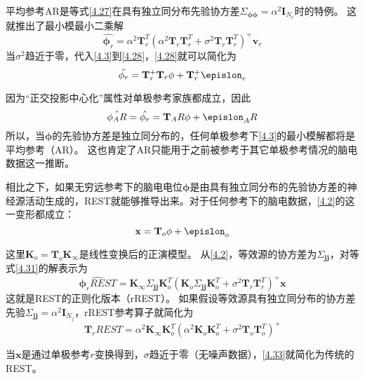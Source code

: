 平均参考AR是等式\eqref{4.27}在具有独立同分布先验协方差$\Sigma_{\mathbf{\phi\phi}}=\alpha^2\mathbf{I}_N_c$时的特例。 这就推出了最小模最小二乘解
\begin{equation}\label{4.28}
\hat{\mathbf{\phi}_r}=\alpha^2\mathbf{T}_r^T(\alpha^2\mathbf{T}_r\mathbf{T}_r^T+\sigma^2\mathbf{T}_r\mathbf{T}_r^T)^+\mathbf{v}_r
\end{equation}
当$\sigma^2$趋近于零，代入\eqref{4.3}到\eqref{4.28}，\eqref{4.28}就可以简化为
\begin{equation}\label{4.29}
\hat{\mathbf{\phi}_r}=\mathbf{T}_r^+\mathbf{T}_r\mathbf{\phi}+\mathbf{T}_r^+\mathbf{\epislon}_r
\end{equation}

因为“正交投影中心化”属性对单极参考家族都成立，因此
\begin{equation}\label{4.30}
\hat{\mathbf{\phi}_AR}=\hat{\mathbf{\phi}_r}=\mathbf{T}_AR\mathbf{\phi}+\mathbf{\epislon}_AR
\end{equation}
所以，当$\mathbf{\phi}$的先验协方差是独立同分布的，任何单极参考下\eqref{4.3}的最小模解都将是平均参考（AR）。 这也肯定了AR只能用于之前被参考于其它单极参考情况的脑电数据这一推断。

相比之下，如果无穷远参考下的脑电电位$\mathbf{\phi}$是由具有独立同分布的先验协方差的神经源活动生成的，REST就能够推导出来。对于任何参考下的脑电数据，\eqref{4.2}的这一变形都成立：
\begin{equation}\label{4.31}
\mathbf{x}=\mathbf{T}_o\mathbf{\phi}+\mathbf{\epislon}_o
\end{equation}


这里$\mathbf{K}_o=\mathbf{T}_o\mathbf{K}_{\infty}$是线性变换后的正演模型。 从\eqref{4.2}，等效源的协方差为$\Sigma_{\mathbf{jj}}$，对等式\eqref{4.31}的解表示为
\begin{equation}\label{4.32}
\hat{\mathbf{\phi}_rREST}=\mathbf{K}_{\infty}\Sigma_{\mathbf{jj}}\mathbf{K}_o^T(\mathbf{K}_o\Sigma_{\mathbf{jj}}\mathbf{K}_o^T+\sigma^2\mathbf{T}_r\mathbf{T}_r^T)^+\mathbf{x}
\end{equation}
这就是REST的正则化版本（rREST）。 如果假设等效源具有独立同分布的协方差先验$\Sigma_\mathbf{jj}=\alpha^2\mathbf{I}_N_j$，rREST参考算子就简化为
\begin{equation}\label{4.33}
\mathbf{T}_rREST=\alpha^2\mathbf{K}_{\infty}\mathbf{K}_o^T(\alpha^2\mathbf{K}_o\mathbf{K}_o^T+\sigma^2\mathbf{T}_o\mathbf{T}_o^T)^+
\end{equation}

当$\mathbf{x}$是通过单极参考$r$变换得到，$\sigma$趋近于零（无噪声数据），\eqref{4.33}就简化为传统的REST。

